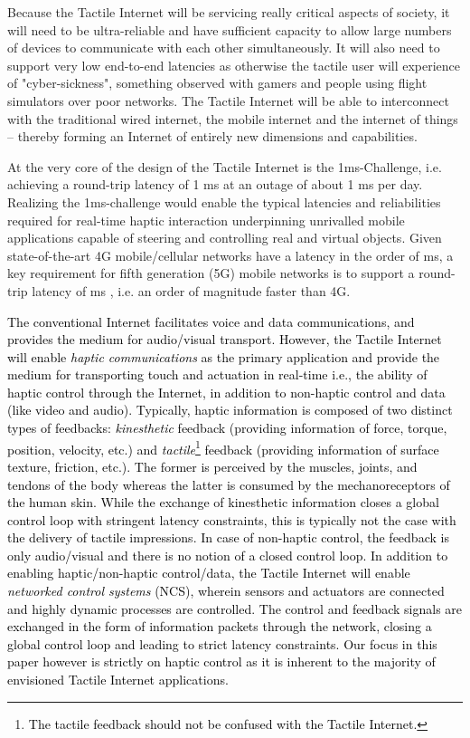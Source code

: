 \documentclass[journal]{IEEEtran}
\begin{document}
Because the Tactile Internet will be servicing really critical aspects of society, it will need to be ultra-reliable and have sufficient capacity to allow large numbers of devices to communicate with each other simultaneously. It will also need to support very low end-to-end latencies as otherwise the tactile user will experience of "cyber-sickness", something observed with gamers and people using flight simulators over poor networks. The Tactile Internet will be able to interconnect with the traditional wired internet, the mobile internet and the internet of things – thereby forming an Internet of entirely new dimensions and capabilities.




At the very core of the design of the Tactile Internet is the 1ms-Challenge, i.e. achieving a round-trip latency of 1 ms at an outage of about 1 ms per day. Realizing the 1ms-challenge would enable the typical latencies and reliabilities required for real-time haptic interaction underpinning unrivalled mobile applications capable of steering and controlling real and virtual objects. Given state-of-the-art 4G mobile/cellular networks have a latency in the order of  ms, a key requirement for fifth generation (5G) mobile networks is to support a round-trip latency of   ms \cite{5G-GF,5G}, i.e. an order of magnitude faster than 4G.


\textcolor{black}{The conventional Internet facilitates voice and data communications, and provides the medium for audio/visual transport. However, the Tactile Internet will enable \emph{haptic communications} \cite{HC} as the primary application and provide the medium for transporting touch and actuation in real-time i.e., the ability of haptic control through the Internet, in addition to non-haptic control and data (like video and audio). Typically, haptic information is composed of two distinct types of feedbacks: \emph{kinesthetic} feedback (providing information of force, torque, position, velocity, etc.) and \emph{tactile}\footnote{\textcolor{black}{The tactile feedback should not be confused with the Tactile Internet.}} feedback (providing information of surface texture, friction, etc.). The former is perceived by the muscles, joints, and tendons of the body whereas the latter is consumed by the 	mechanoreceptors of the human skin. While the exchange of kinesthetic information closes a global control loop with stringent latency constraints, this is typically not the case with the delivery of tactile impressions. In case of non-haptic control, the feedback is only audio/visual and there is no notion of a closed control loop.  In addition to enabling haptic/non-haptic control/data, the Tactile Internet will enable \emph{networked control systems} (NCS), wherein sensors and actuators are connected and highly dynamic processes are controlled. The control and feedback signals are exchanged in the form of information packets through the network, closing a global control loop and leading to strict latency constraints. Our focus in this paper however is strictly on haptic control as it is inherent to the majority of envisioned Tactile Internet applications.  }
\end{document}
